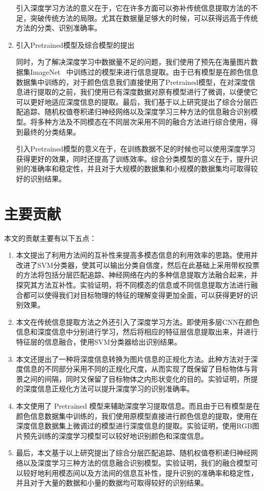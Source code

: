 \begin{enumerate}
引入深度学习方法的意义在于，它在许多方面可以弥补传统信息提取方法的不足，突破传统方法的局限。尤其在数据量足够大的时候，可以获得远高于传统方法的分类、识别准确率。

\item 引入Pretrained模型及综合模型的提出

同时，为了解决深度学习中数据量不足的问题，我们使用了预先在海量图片数据集ImageNet~ 中训练过的模型来进行信息提取。由于已有模型是在颜色信息数据集中训练的，对于颜色信息我们直接使用了Pretrained模型，在对深度信息进行提取的之前，我们使用已有深度数据对原有模型进行了微调，以便使它可以更好地适应深度信息的提取。最后，我们基于以上研究提出了综合分层匹配追踪、随机权值卷积递归神经网络以及深度学习三种方法的信息融合识别模型。将多种方法及不同模态在不同层次采用不同的融合方法进行综合使用，得到最终的分类结果。

引入Pretrained模型的意义在于，在训练数据不足的时候也可以使用深度学习获得更好的效果，同时还提高了训练效率。综合分类模型的意义在于，提升识别的准确率和稳定性，并且对于大规模的数据集和小规模的数据集均可取得较好的识别结果。
\end{enumerate}

\section{主要贡献}
\label{sec:ourcontribution}

本文的贡献主要有以下五点：

\begin{enumerate}
\item 本文提出了利用方法间的互补性来提高多模态信息的利用效率的思路。使用并改进了SVM分类器，使其可以输出分类自信度，然后在此基础上采用带权投票的方法将包括分层匹配追踪、神经网络在内的多种信息提取方法融合起来，并探究其方法互补性。实验证明，将不同模态的信息或不同信息提取方法进行融合都可以使得我们对目标物理的特征的理解变得更加全面，可以获得更好的识别效果。

\item 本文在传统信息提取方法之外还引入了深度学习方法。即使用多层CNN在颜色信息和深度信息中分别进行学习，然后将相应的特征层信息提取出来，并进行特征层的信息融合，使用SVM分类器给出识别结果。

\item 本文还提出了一种将深度信息转换为图片信息的正规化方法。此种方法对于深度信息的不同部分采用不同的正规化尺度，从而实现了既保留了目标物体与背景之间的间隔，同时又保留了目标物体之内形状变化的目的。实验证明，所提的深度信息正规化方法可以提升深度学习的识别准确率。

\item 本文使用了 Pretrained 模型来辅助深度学习提取信息。而且由于已有模型是在颜色信息数据集中训练的，我们使用原模型直接进行颜色信息的提取，使用在深度信息数据集上微调过的模型进行深度信息的提取。实验证明，使用RGB图片预先训练的深度学习模型可以较好地识别颜色和深度信息。

\item 最后，本文基于以上研究提出了综合分层匹配追踪、随机权值卷积递归神经网络以及深度学习三种方法的信息融合识别模型。实验证明，我们的融合模型可以较好地利用模态间以及方法间的信息互补性，提升识别的准确率和稳定性，并且对于大量的数据和小量的数据均可取得较好的识别结果。
\end{enumerate}

